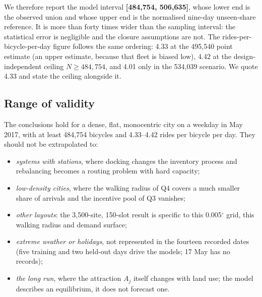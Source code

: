 We therefore report the model interval \textbf{[484,754, 506,635]}, whose lower end is
the observed union and whose upper end is the normalised nine-day unseen-share
reference. It is more than forty times wider than the sampling interval: the
statistical error is negligible and the closure assumptions are
not. The rides-per-bicycle-per-day figure follows the same ordering: 4.33 at the
495,540 point estimate (an upper estimate, because that fleet is biased low), 4.42 at the
design-independent ceiling $N\ge484{,}754$, and 4.01 only in the 534,039 scenario. We
quote 4.33 and state the ceiling alongside it.

\subsection{Range of validity}

The conclusions hold for a dense, flat, monocentric city on a weekday in May 2017,
with at least 484,754 bicycles and 4.33--4.42 rides per bicycle per day. They should not
be extrapolated to:

\begin{itemize}[leftmargin=1.4em]
\item \emph{systems with stations}, where docking changes the inventory process and
  rebalancing becomes a routing problem with hard capacity;
\item \emph{low-density cities}, where the walking radius of Q4 covers a much smaller
  share of arrivals and the incentive pool of Q3 vanishes;
\item \emph{other layouts}: the 3,500-site, 150-slot result is specific to this
  0.005$^\circ$ grid, this walking radius and demand surface;
\item \emph{extreme weather or holidays}, not represented in the fourteen recorded
  dates (five training and two held-out days drive the models; 17 May has no records);
\item \emph{the long run}, where the attraction $A_j$ itself changes with land use; the
  model describes an equilibrium, it does not forecast one.
\end{itemize}
